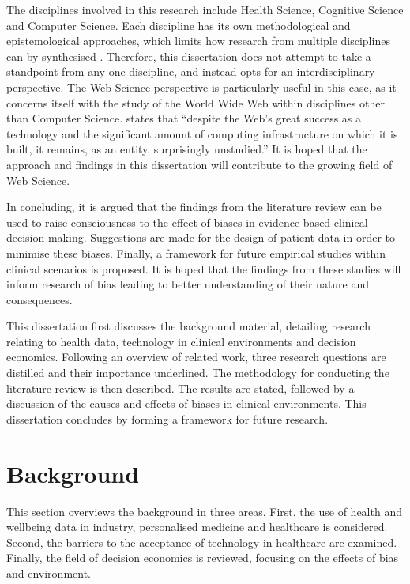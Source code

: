 \documentclass[a4paper]{scrartcl}     %
\newif\ifbreaksection
\begin{document}
  The disciplines involved in this research include Health Science, Cognitive Science and Computer Science. Each discipline has its own methodological and epistemological approaches, which limits how research from multiple disciplines can by synthesised \citep{Repko2011}. Therefore, this dissertation does not attempt to take a standpoint from any one discipline, and instead opts for an interdisciplinary perspective. The Web Science perspective is particularly useful in this case, as it concerns itself with the study of the World Wide Web within disciplines other than Computer Science. \citet{Hendler2008} states that ``despite the Web's great success as a technology and the significant amount of computing infrastructure on which it is built, it remains, as an entity, surprisingly unstudied.''  It is hoped that the approach and findings in this dissertation will contribute to the growing field of Web Science.


  In concluding, it is argued that the findings from the literature review can be used to raise consciousness to the effect of biases in evidence-based clinical decision making. Suggestions are made for the design of patient data in order to minimise these biases. Finally, a framework for future empirical studies within clinical scenarios is proposed. It is hoped that the findings from these studies will inform research of bias leading to better understanding of their nature and consequences.

  This dissertation first discusses the background material, detailing research relating to health data, technology in clinical environments and decision economics. Following an overview of related work, three research questions are distilled and their importance underlined. The methodology for conducting the literature review is then described. The results are stated, followed by a discussion of the causes and effects of biases in clinical environments. This dissertation concludes by forming a framework for future research.


\ifbreaksection\clearpage\fi\section{Background} %

  This section overviews the background in three areas. First, the use of health and wellbeing data in industry, personalised medicine and healthcare is considered. Second, the barriers to the acceptance of technology in healthcare are examined. Finally, the field of decision economics is reviewed, focusing on the effects of bias and environment.
\end{document}

